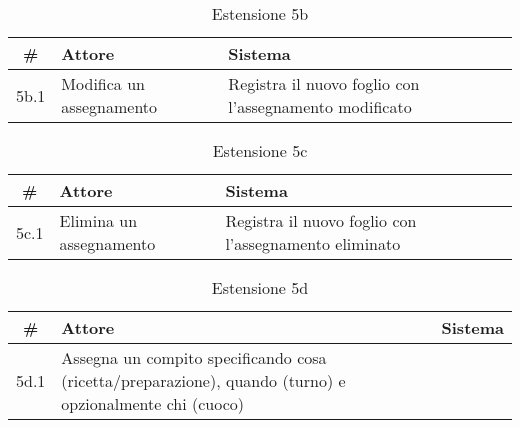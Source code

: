 \begin{table}[H]\centering\caption*{Estensione 5b}
    \small
    \begin{tabular}{|c|p{7cm}|p{6.23cm}|}
        \hline\bfseries \# & \bfseries Attore         & \bfseries Sistema                                      \\\hline
        5b.1               & Modifica un assegnamento & Registra il nuovo foglio con l’assegnamento modificato \\\hline
    \end{tabular}
\end{table}

\begin{table}[H]\centering\caption*{Estensione 5c}
    \small
    \begin{tabular}{|c|p{7cm}|p{6.23cm}|}
        \hline\bfseries \# & \bfseries Attore        & \bfseries Sistema                                     \\\hline
        5c.1               & Elimina un assegnamento & Registra il nuovo foglio con l’assegnamento eliminato \\\hline
    \end{tabular}
\end{table}

\begin{table}\centering\caption*{Estensione 5d}
    \small
    \begin{tabular}{|c|p{7cm}|p{6.23cm}|}
        \hline\bfseries \# & \bfseries Attore                                                                                        & \bfseries Sistema                                 \\\hline
        5d.1               & Assegna un compito specificando cosa (ricetta/preparazione), quando (turno) e opzionalmente chi (cuoco) & \color{red}{Cuoco non disponibile nel dato turno} \\\hline
    \end{tabular}
\end{table}